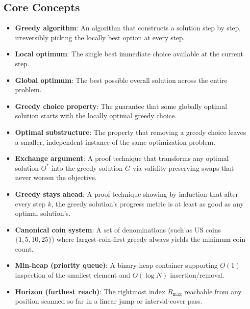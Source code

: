 \documentclass[11pt,a4paper]{article}
\theoremstyle{definition}
\begin{document}
\subsection*{Core Concepts}
\begin{itemize}
    \item \textbf{Greedy algorithm}: An algorithm that constructs a solution step by step, irreversibly picking the locally best option at every step.
    \item \textbf{Local optimum}: The single best immediate choice available at the current step.
    \item \textbf{Global optimum}: The best possible overall solution across the entire problem.
    \item \textbf{Greedy choice property}: The guarantee that some globally optimal solution starts with the locally optimal greedy choice.
    \item \textbf{Optimal substructure}: The property that removing a greedy choice leaves a smaller, independent instance of the same optimization problem.
    \item \textbf{Exchange argument}: A proof technique that transforms any optimal solution $O^*$ into the greedy solution $G$ via validity-preserving swaps that never worsen the objective.
    \item \textbf{Greedy stays ahead}: A proof technique showing by induction that after every step $k$, the greedy solution's progress metric is at least as good as any optimal solution's.
    \item \textbf{Canonical coin system}: A set of denominations (such as US coins $\{1, 5, 10, 25\}$) where largest-coin-first greedy always yields the minimum coin count.
    \item \textbf{Min-heap (priority queue)}: A binary-heap container supporting $O(1)$ inspection of the smallest element and $O(\log N)$ insertion/removal.
    \item \textbf{Horizon (furthest reach)}: The rightmost index $R_{\max}$ reachable from any position scanned so far in a linear jump or interval-cover pass.
\end{itemize}
\end{document}
